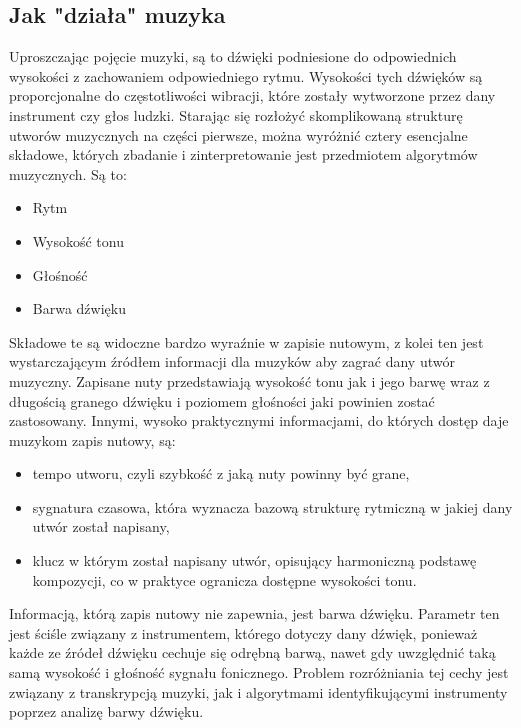 \documentclass[12pt,a4paper,twoside]{mwart}
\begin{document}
\subsection{Jak "działa" muzyka}
Uproszczając pojęcie muzyki, są to dźwięki podniesione do odpowiednich wysokości z zachowaniem odpowiedniego rytmu. Wysokości tych dźwięków są proporcjonalne do częstotliwości wibracji, które zostały wytworzone przez dany instrument czy głos ludzki. Starając się rozłożyć skomplikowaną strukturę utworów muzycznych na części pierwsze, można wyróżnić cztery esencjalne składowe, których zbadanie i zinterpretowanie jest przedmiotem algorytmów muzycznych. Są to:
\begin{itemize}
\item Rytm
\item Wysokość tonu
\item Głośność
\item Barwa dźwięku
\end{itemize}
Składowe te są widoczne bardzo wyraźnie w zapisie nutowym, z kolei ten jest wystarczającym źródłem informacji dla muzyków aby zagrać dany utwór muzyczny. Zapisane nuty przedstawiają wysokość tonu jak i jego barwę wraz z długością granego dźwięku i poziomem głośności jaki powinien zostać zastosowany. Innymi, wysoko praktycznymi informacjami, do których dostęp daje muzykom zapis nutowy, są: 
\begin{itemize}
  \item tempo utworu, czyli szybkość z jaką nuty powinny być grane, 
  \item sygnatura czasowa, która wyznacza bazową strukturę rytmiczną w jakiej dany utwór został napisany,
  \item klucz w którym został napisany utwór, opisujący harmoniczną podstawę kompozycji, co w praktyce ogranicza dostępne wysokości tonu.
\end{itemize} 
Informacją, którą zapis nutowy nie zapewnia, jest barwa dźwięku. Parametr ten jest ściśle związany z instrumentem, którego dotyczy dany dźwięk, ponieważ każde ze źródeł dźwięku cechuje się odrębną barwą, nawet gdy uwzględnić taką samą wysokość i głośność sygnału fonicznego. Problem rozróżniania tej cechy jest związany z transkrypcją muzyki, jak i algorytmami identyfikującymi instrumenty poprzez analizę barwy dźwięku.
\end{document}
